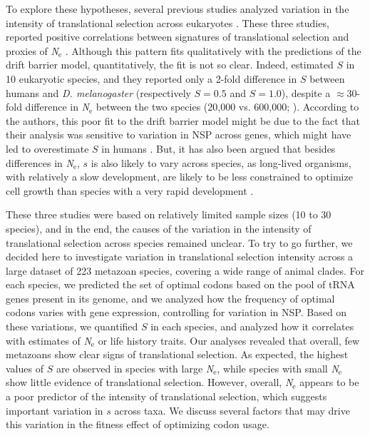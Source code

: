 To explore these hypotheses, several previous studies analyzed variation in the intensity of translational selection across eukaryotes \citep{subramanian_nearly_2008, dos_reis_estimating_2009, galtier_codon_2018}. These three studies, reported positive correlations between signatures of translational selection and proxies of \textit{N}$_{\text{e}}$ \citep{subramanian_nearly_2008, dos_reis_estimating_2009, galtier_codon_2018}. Although this pattern fits qualitatively with the predictions of the drift barrier model, quantitatively, the fit is not so clear. Indeed, \citet{dos_reis_estimating_2009} estimated $S$ in 10 eukaryotic species, and they reported only a 2-fold difference in $S$ between humans and \textit{D. melanogaster} (respectively $S=0.5$ and $S=1.0$), despite a $\approx$30-fold difference in \textit{N}$_{\text{e}}$ between the two species (20,000 vs. 600,000; \citet{lynch_divergence_2023}). According to the authors, this poor fit to the drift barrier model might be due to the fact that their analysis was sensitive to variation in NSP across genes, which might have led to overestimate $S$ in humans \citep{dos_reis_estimating_2009}. But, it has also been argued that besides differences in \textit{N}$_{\text{e}}$, $s$ is also likely to vary across species, as long-lived organisms, with relatively a slow development, are likely to be less constrained to optimize cell growth than species with a very rapid development \citep{subramanian_nearly_2008}. 

These three studies were based on relatively limited sample sizes (10 to 30 species), and in the end, the causes of the variation in the intensity of translational selection across species remained unclear. To try to go further, we decided here to investigate variation in translational selection intensity across a large dataset of 223 metazoan species, covering a wide range of animal clades. For each species, we predicted the set of optimal codons based on the pool of tRNA genes present in its genome, and we analyzed how the frequency of optimal codons varies with gene expression, controlling for variation in NSP. Based on these variations, we quantified $S$ in each species, and analyzed how it correlates with estimates of \textit{N}$_{\text{e}}$ or life history traits. Our analyses revealed that overall, few metazoans show clear signs of translational selection. As expected, the highest values of $S$ are observed in species with large \textit{N}$_{\text{e}}$, while species with small \textit{N}$_{\text{e}}$ show little evidence of translational selection. However, overall, \textit{N}$_{\text{e}}$ appears to be a poor predictor of the intensity of translational selection, which suggests important variation in $s$ across taxa. We discuss several factors that may drive this variation in the fitness effect of optimizing codon usage. 



